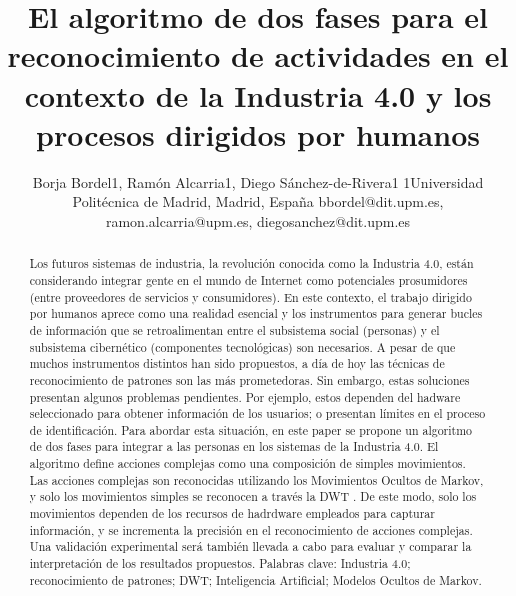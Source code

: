 \documentclass{article}
\title {\textbf{El algoritmo de dos fases para el reconocimiento de actividades en el contexto de la Industria 4.0 y los procesos dirigidos por humanos
}}
\author{Borja Bordel1, Ramón Alcarria1, Diego Sánchez-de-Rivera1 1Universidad Politécnica de Madrid, Madrid, España bbordel@dit.upm.es, ramon.alcarria@upm.es, diegosanchez@dit.upm.es}
\begin{document}
\maketitle

\begin{abstract}
	Los futuros sistemas de industria, la revolución conocida como la Industria 4.0, están considerando integrar gente en el mundo de Internet como potenciales prosumidores (entre proveedores de servicios y consumidores). En este contexto, el trabajo dirigido por humanos aprece como una realidad esencial y los instrumentos para generar bucles  de información que se retroalimentan entre el subsistema social (personas) y el subsistema cibernético (componentes tecnológicas) son necesarios. A pesar de que muchos instrumentos distintos han sido propuestos, a día de hoy las técnicas de reconocimiento de patrones son las más prometedoras. Sin embargo, estas soluciones presentan algunos problemas pendientes. Por ejemplo, estos dependen del hadware seleccionado para obtener información de los usuarios; o presentan límites en el proceso de identificación. Para abordar esta situación, en este paper se propone un algoritmo de dos fases para integrar a las personas en los sistemas de la Industria 4.0. El algoritmo define acciones complejas como una composición de simples movimientos. Las acciones complejas son reconocidas utilizando los Movimientos Ocultos de Markov, y solo los movimientos simples se reconocen a través la DWT . De este modo, solo los movimientos dependen de los recursos de hadrdware empleados para capturar información, y se incrementa  la precisión en el reconocimiento de acciones complejas. Una validación experimental será también llevada a cabo para evaluar y comparar la interpretación de los resultados propuestos.
	Palabras clave: Industria 4.0; reconocimiento de patrones; DWT; Inteligencia Artificial; Modelos Ocultos de Markov.
\end{abstract}
\end{document}

